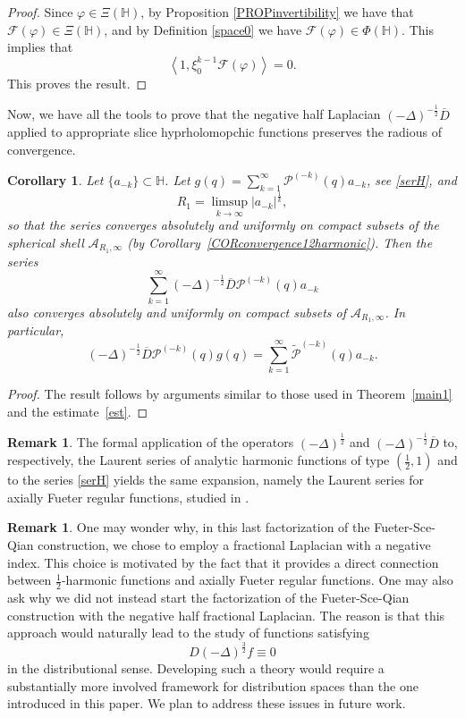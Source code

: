 \documentclass[reqno,11pt]{amsart}
\newtheorem{corollary}[theorem]{Corollary}
\theoremstyle{definition}
\newtheorem{remark}[theorem]{Remark}
\begin{document}
\begin{proof}
Since $\varphi \in \Xi(\mathbb{H})$, by Proposition \ref{PROPinvertibility} we have that $\mathcal{F}(\varphi) \in \Xi(\mathbb{H})$, and by Definition \ref{space0} we have $ \mathcal{F}(\varphi) \in \Phi(\mathbb{H})$. This implies that
$$ \left \langle 1, \xi_{0}^{k-1} \mathcal{F}(\varphi) \right \rangle=0.$$
This proves the result.
\end{proof}

Now, we have all the tools to prove that the negative half Laplacian $(-\Delta)^{-\frac{1}{2}} \overline{D}$ applied to appropriate slice hyprholomopchic functions preserves the radious of convergence.

\begin{corollary}
\label{main4}
Let $ \{a_{-k}\} \subset \mathbb{H}$. Let $g(q) = \sum_{k=1}^{\infty }\mathcal{P}^{(-k)}(q)a_{-k}$, see \eqref{serH}, and
\[
R_1= \limsup_{k\to \infty} |a_{-k}|^\frac{1}{k},
\]
so that the series converges absolutely and uniformly  on compact subsets of the spherical shell $\mathcal{A}_{R_1,\infty}$ (by Corollary~\ref{CORconvergence12harmonic}). Then the series
\[
\sum_{k=1}^\infty (-\Delta)^{-\frac{1}{2}} \overline{D}\mathcal{P}^{(-k)}(q) a_{-k}
\]
also converges absolutely and uniformly on compact subsets of $\mathcal{A}_{R_1,\infty}$.	In particular,
\[
(-\Delta)^{-\frac{1}{2}} \overline{D}\mathcal{P}^{(-k)}(q)g(q)= \sum_{k=1}^\infty \widetilde{\mathcal{P}}^{(-k)}(q)a_{-k}.
\]
\end{corollary}
\begin{proof}
The result follows by arguments similar to those used in Theorem~\ref{main1} and the estimate~\eqref{est}.
\end{proof}


\begin{remark}
The formal application of the operators $(-\Delta)^{\frac{1}{2}}$ and $(-\Delta)^{-\frac{1}{2}}\overline{D}$ to, respectively, the Laurent series of analytic harmonic functions of type $\left(\frac{1}{2},1\right)$ and to the series \eqref{serH} yields the same expansion, namely the Laurent series for axially Fueter regular functions, studied in \cite{CDSm}.
\end{remark}

\begin{remark}
One may wonder why, in this last factorization of the Fueter-Sce-Qian construction, we chose to employ a fractional Laplacian with a negative index. This choice is motivated by the fact that it provides a direct connection between $\frac{1}{2}$-harmonic functions and axially Fueter regular functions. One may also ask why we did not instead start the factorization of the Fueter-Sce-Qian construction with the negative half fractional Laplacian. The reason is that this approach would naturally lead to the study of functions satisfying
$$
D(-\Delta)^{\frac{3}{2}}f\equiv 0
$$
in the distributional sense. Developing such a theory would require a substantially more involved framework for distribution spaces than the one introduced in this paper. We plan to address these issues in future work.
\end{remark}
\end{document}
